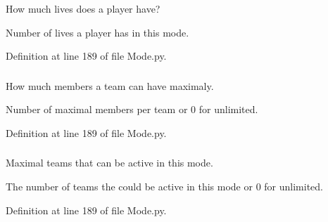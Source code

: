 \hypertarget{class_mode_1_1_mode_a323bce82bf2ed29d058891f084551c0e}{
\subsubsection[{lives}]{}}
\label{class_mode_1_1_mode_a323bce82bf2ed29d058891f084551c0e}


\-How much lives does a player have? 

\-Number of lives a player has in this mode. 

\-Definition at line 189 of file \-Mode.\-py.

\hypertarget{class_mode_1_1_mode_a78777948faad5bc1cdfe9af5b2319bac}{
\subsubsection[{max\-\_\-team\-\_\-members}]{}}
\label{class_mode_1_1_mode_a78777948faad5bc1cdfe9af5b2319bac}


\-How much members a team can have maximaly. 

\-Number of maximal members per team or 0 for unlimited. 

\-Definition at line 189 of file \-Mode.\-py.

\hypertarget{class_mode_1_1_mode_aecd7840424d68b82a21065ed629617bd}{
\subsubsection[{max\-\_\-teams}]{}}
\label{class_mode_1_1_mode_aecd7840424d68b82a21065ed629617bd}


\-Maximal teams that can be active in this mode. 

\-The number of teams the could be active in this mode or 0 for unlimited. 

\-Definition at line 189 of file \-Mode.\-py.

